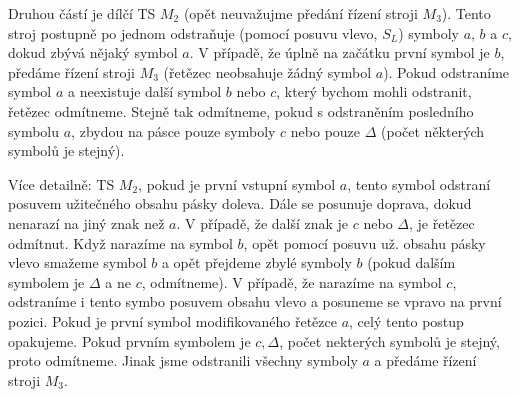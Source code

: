 \documentclass[a4paper,12pt]{article}
\begin{document}
\begin{enumerate}[label=\textbf{\arabic*}.]
\begin{center}
      \end{center}
   Druhou částí je dílčí TS $M_2$ (opět neuvažujme předání řízení stroji $M_3$). Tento stroj postupně po jednom odstraňuje (pomocí posuvu vlevo, $S_L$) symboly $a$, $b$ a $c$, 
   dokud zbývá nějaký symbol $a$. V případě, že úplně na začátku první symbol je $b$, předáme řízení stroji $M_3$ (řetězec neobsahuje žádný symbol $a$). Pokud odstraníme symbol $a$ a neexistuje další symbol $b$ nebo $c$, který bychom mohli odstranit, řetězec odmítneme.
   Stejně tak odmítneme, pokud s odstraněním posledního symbolu $a$, zbydou na pásce pouze symboly $c$ nebo pouze $\Delta$ (počet některých symbolů je stejný). 
   
   Více detailně: TS $M_2$, pokud je první vstupní symbol $a$,
   tento symbol odstraní posuvem užitečného obsahu pásky doleva. Dále se posunuje doprava, dokud nenarazí na jiný znak než $a$. 
   V případě, že další znak je $c$ nebo $\Delta$, je řetězec odmítnut. Když narazíme na symbol $b$, opět pomocí posuvu už. obsahu pásky vlevo
   smažeme symbol $b$ a opět přejdeme zbylé symboly $b$ (pokud dalším symbolem je $\Delta$ a ne $c$, odmítneme). V případě, že narazíme na symbol $c$,
   odstraníme i tento symbo posuvem obsahu vlevo a posuneme se vpravo na první pozici. Pokud je první symbol modifikovaného řetězce $a$, celý tento 
   postup opakujeme. Pokud prvním symbolem je $c, \Delta$, počet nekterých symbolů je stejný, proto odmítneme. Jinak jsme odstranili všechny symboly
   $a$ a předáme řízení stroji $M_3$.
   \begin{center}
\end{center}
\end{enumerate}
\end{document}
